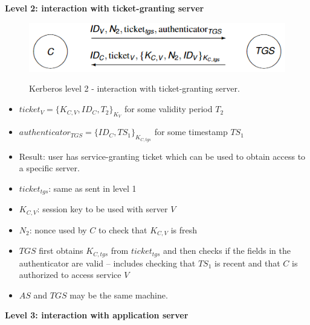 \documentclass{article}
\begin{document}
\textbf{Level 2: interaction with ticket-granting server}

\noindent\begin{minipage}{0.6\textwidth}%
\begin{figure}[H]
\centering
\includegraphics[scale=0.72]{Images/kerberoslevel2.png}
\label{fig:fround}
\caption{Kerberos level 2 - interaction with ticket-granting server.}
\end{figure}
\end{minipage}%
\hfill%
\begin{minipage}{0.38\textwidth}
\begin{itemize}
    \item $ticket_{V}=\{K_{C,V},ID_C,T_2\}_{K_{V}}$  for some validity period $T_2$
    \item $authenticator_{TGS}=\{ID_C,TS_1\}_{K_{C,tgs}}$  for some timestamp $TS_1$
    \item Result: user has service-granting ticket which can be used to obtain access to a specific server.
\end{itemize}
\end{minipage}
\begin{itemize}
    \item $ticket_{tgs}$: same as sent in level 1
    \item $K_{C,V}$: session key to be used with server $V$ 
    \item $N_2$: nonce used by $C$ to check that $K_{C,V}$ is fresh
    \item $TGS$ first obtains $K_{C,tgs}$ from $ticket_{tgs}$ and then checks if the fields in the authenticator are valid – includes checking that $TS_1$ is recent and that $C$ is authorized to access service $V$
    \item $AS$ and $TGS$ may be the same machine.
\end{itemize}

\textbf{Level 3: interaction with application server}
\end{document}
